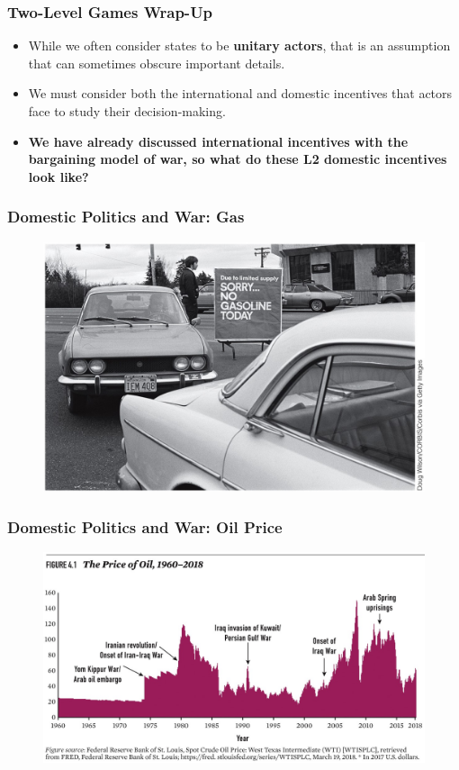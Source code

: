 \documentclass{beamer}
\begin{document}
\begin{frame} 
	\frametitle{\LARGE{Two-Level Games Wrap-Up}}
	\begin{itemize}
		\item While we often consider states to be \textbf{unitary actors}, that is an assumption that can sometimes obscure important details. \pause
		\item We must consider both the international and domestic incentives that actors face to study their decision-making. \pause
		\item\textbf{We have already discussed international incentives with the bargaining model of war, so what do these L2 domestic incentives look like?}
	\end{itemize}
\end{frame}


\begin{frame} 
	\frametitle{\LARGE{Domestic Politics and War: Gas}}
	\begin{figure}[ht!]
		\centering
		\includegraphics[width=\textwidth,height=0.9\textheight,keepaspectratio]{Gasshort.jpg}
	\end{figure}
\end{frame}

\begin{frame} 
	\frametitle{\LARGE{Domestic Politics and War: Oil Price}}
	\begin{figure}[ht!]
		\centering
		\includegraphics[width=\textwidth,height=0.9\textheight,keepaspectratio]{Oilpricewar.jpg}
	\end{figure}
\end{frame}
\end{document}

